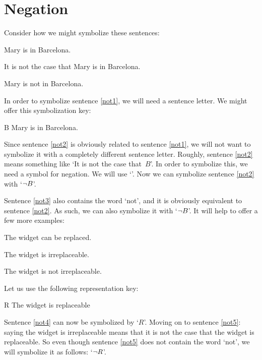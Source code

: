         
\section{Negation}

Consider how we might symbolize these sentences:
	\begin{earg}
	\item[\ex{not1}] Mary is in Barcelona.
	\item[\ex{not2}] It is not the case that Mary is in Barcelona.
	\item[\ex{not3}] Mary is not in Barcelona.
	\end{earg}
In order to symbolize sentence \ref{not1}, we will need a sentence letter. We might offer this symbolization key:
	\begin{ekey}
		\item[B] Mary is in Barcelona.
	\end{ekey}
Since sentence \ref{not2} is obviously related to sentence \ref{not1}, we will not want to symbolize it with a completely different sentence letter. Roughly, sentence \ref{not2} means something like `It is not the case that~$B$'. In order to symbolize this, we need a symbol for negation. We will use `\enot'. Now we can symbolize sentence \ref{not2} with `$\neg B$'.

Sentence \ref{not3} also contains the word `not', and it is obviously equivalent to sentence \ref{not2}. As such, we can also symbolize it with `$\neg B$'.
It will help to offer a few more examples:
	\begin{earg}
		\item[\ex{not4}] The widget can be replaced.
		\item[\ex{not5}] The widget is irreplaceable.
		\item[\ex{not5b}] The widget is not irreplaceable.
	\end{earg}
Let us use the following representation key:
	\begin{ekey}
		\item[R] The widget is replaceable
	\end{ekey}
Sentence \ref{not4} can now be symbolized by `$R$'. Moving on to sentence \ref{not5}: saying the widget is irreplaceable means that it is not the case that the widget is replaceable. So even though sentence \ref{not5} does not contain the word `not', we will symbolize it as follows: `$\neg R$'.

